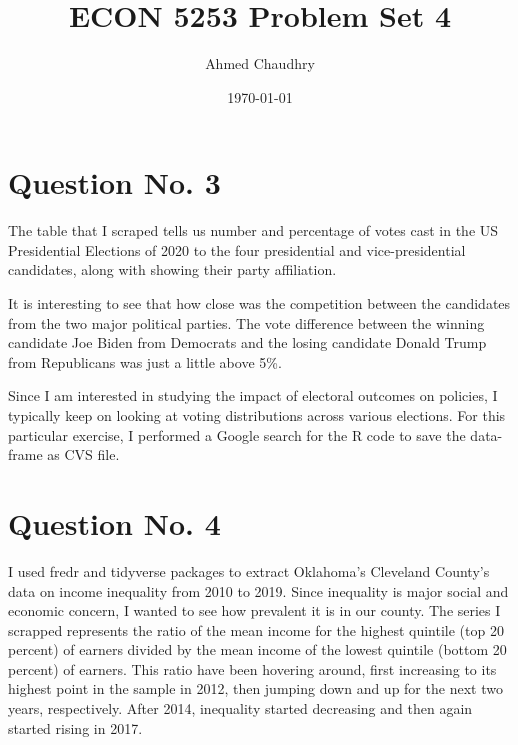 \documentclass{article}
\title{ECON 5253 Problem Set 4}
\author{Ahmed Chaudhry}
\date{\today}
\begin{document}
\maketitle
\section{Question No. 3}
The table that I scraped tells us number and percentage of votes cast in the US Presidential Elections of 2020 to the four presidential and vice-presidential candidates, along with showing their party affiliation. 

It is interesting to see that how close was the competition between the candidates from the two major political parties. The vote difference between the winning candidate Joe Biden from Democrats and the losing candidate Donald Trump from Republicans was just a little above 5\%.

Since I am interested in studying the impact of electoral outcomes on policies, I typically keep on looking at voting distributions across various elections.
For this particular exercise, I performed a Google search for the R code to save the data-frame as CVS file. 

\section{Question No. 4}
I used fredr and tidyverse packages to extract Oklahoma's Cleveland County's data on income inequality from 2010 to 2019. Since inequality is major social and economic concern, I wanted to see how prevalent it is in our county. The series I scrapped represents the ratio of the mean income for the highest quintile (top 20 percent) of earners divided by the mean income of the lowest quintile (bottom 20 percent) of earners. This ratio have been hovering around, first increasing to its highest point in the sample in 2012, then jumping down and up for the next two years, respectively. After 2014, inequality started decreasing and then again started rising in 2017.
\end{document}
